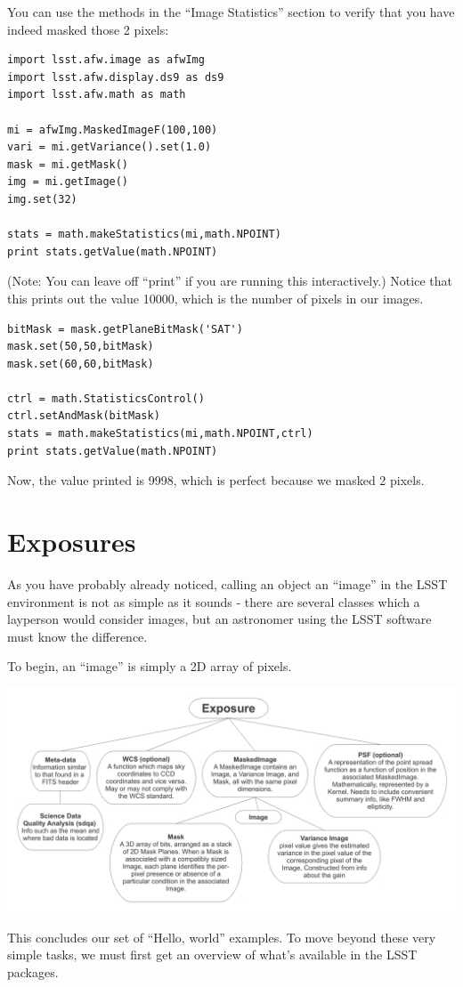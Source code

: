 You can use the methods in the ``Image Statistics'' section to verify that you have indeed masked those 2 pixels:

\begin{verbatim}
import lsst.afw.image as afwImg
import lsst.afw.display.ds9 as ds9
import lsst.afw.math as math

mi = afwImg.MaskedImageF(100,100)
vari = mi.getVariance().set(1.0)
mask = mi.getMask()
img = mi.getImage()
img.set(32)

stats = math.makeStatistics(mi,math.NPOINT)
print stats.getValue(math.NPOINT)
\end{verbatim}

(Note: You can leave off ``print'' if you are running this interactively.)  Notice that this prints out the value 10000, which is the number of pixels in our images.

\begin{verbatim}
bitMask = mask.getPlaneBitMask('SAT')
mask.set(50,50,bitMask)
mask.set(60,60,bitMask)

ctrl = math.StatisticsControl()
ctrl.setAndMask(bitMask)
stats = math.makeStatistics(mi,math.NPOINT,ctrl)
print stats.getValue(math.NPOINT)
\end{verbatim}

Now, the value printed is 9998, which is perfect because we masked 2 pixels.

\section{Exposures}
As you have probably already noticed, calling an object an ``image'' in the LSST environment is not as simple as it sounds - there are several classes which a layperson would consider images, but an astronomer using the LSST software must know the difference.

To begin, an ``image'' is simply a 2D array of pixels.

\includegraphics[angle=90,scale=0.5]{./figures/exposure.pdf}




\vskip0.5in

This concludes our set of ``Hello, world'' examples.  To move beyond
these very simple tasks, we must first get an overview of what's
available in the LSST packages.

